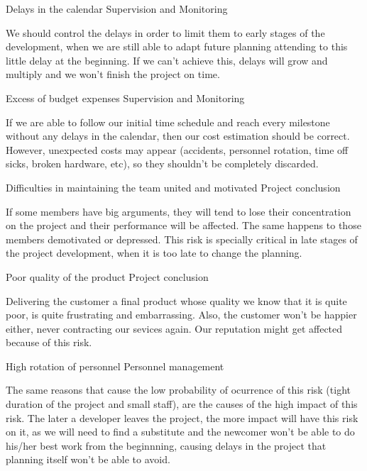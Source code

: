 \begin{risk}{Delays in the calendar}
\riskcat Supervision and Monitoring

We should control the delays in order to limit them to early stages of the development, when we are still able to adapt future planning attending to this little delay at the beginning. If we can't achieve this, delays will grow and multiply and we won't finish the project on time.
\end{risk}

\begin{risk}{Excess of budget expenses}
\riskcat Supervision and Monitoring

If we are able to follow our initial time schedule and reach every milestone without any delays in the calendar, then our cost estimation should be correct. However, unexpected costs may appear (accidents, personnel rotation, time off sicks, broken hardware, etc), so they shouldn't be completely discarded.
\end{risk}

\begin{risk}{Difficulties in maintaining the team united and motivated}
\riskcat Project conclusion

If some members have big arguments, they will tend to lose their concentration on the project and their performance will be affected. The same happens to those members demotivated or depressed. This risk is specially critical in late stages of the project development, when it is too late to change the planning.
\end{risk}

\begin{risk}{Poor quality of the product}
\riskcat Project conclusion

Delivering the customer a final product whose quality we know that it is quite poor, is quite frustrating and embarrassing. Also, the customer won't be happier either, never contracting our sevices again. Our reputation might get affected because of this risk.
\end{risk}

\begin{risk}{High rotation of personnel}
\riskcat Personnel management

The same reasons that cause the low probability of ocurrence of this risk (tight duration of the project and small staff), are the causes of the high impact of this risk. The later a developer leaves the project, the more impact will have this risk on it, as we will need to find a substitute and the newcomer won't be able to do his/her best work from the beginnning, causing delays in the project that planning itself won't be able to avoid.
\end{risk}


